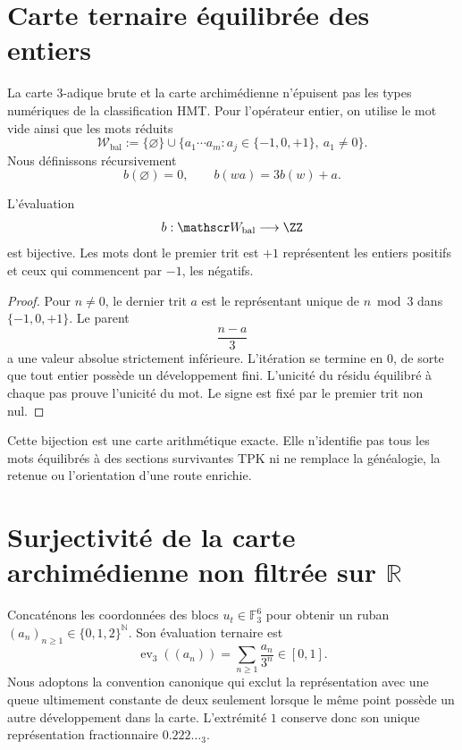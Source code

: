 \section{Carte ternaire équilibrée des entiers}

La carte 3-adique brute et la carte archimédienne n'épuisent pas les types numériques
de la classification HMT. Pour l'opérateur entier, on utilise le mot vide ainsi que les
mots réduits
\[
 \mathscr W_{\mathrm{bal}}
 :=\{\varnothing\}\cup
 \{a_1\cdots a_m:
 a_j\in\{-1,0,+1\},\ a_1\ne0\}.
\]
Nous définissons récursivement
\[
 b(\varnothing)=0,
 \qquad
 b(wa)=3b(w)+a.
\]

\begin{theorem}
\label{pf84:C03}
L'évaluation
\[
 b:\mathscr W_{\mathrm{bal}}\longrightarrow\ZZ
\]
est bijective. Les mots dont le premier trit est \(+1\) représentent les
entiers positifs et ceux qui commencent par \(-1\), les négatifs.
\end{theorem}

\begin{proof}
Pour \(n\ne0\), le dernier trit \(a\) est le représentant unique de
\(n\bmod3\) dans \(\{-1,0,+1\}\). Le parent
\[
 \frac{n-a}{3}
\]
a une valeur absolue strictement inférieure. L'itération se termine en \(0\), de
sorte que tout entier possède un développement fini. L'unicité du résidu
équilibré à chaque pas prouve l'unicité du mot. Le signe est
fixé par le premier trit non nul.
\end{proof}

\begin{remark}
Cette bijection est une carte arithmétique exacte. Elle n'identifie pas tous les
mots équilibrés à des sections survivantes TPK ni ne remplace la
généalogie, la retenue ou l'orientation d'une route enrichie.
\end{remark}

\section{Surjectivité de la carte archimédienne non filtrée sur \(\mathbb R\)}

Concaténons les coordonnées des blocs
\(u_t\in\mathbb F_3^6\) pour obtenir un ruban
\((a_n)_{n\geq1}\in\{0,1,2\}^{\mathbb N}\). Son évaluation ternaire est
\[
 \operatorname{ev}_3((a_n))=
 \sum_{n\geq1}\frac{a_n}{3^n}\in[0,1].
\]
Nous adoptons la convention canonique qui exclut la représentation avec une queue
ultimement constante de deux seulement lorsque le même point possède un autre développement
dans la carte. L'extrémité \(1\) conserve donc son unique représentation
fractionnaire \(0.222\ldots{}_3\).

